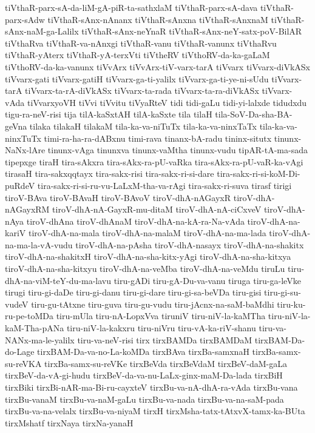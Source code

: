 {tiVthaR-parx-sA-da-liM-gA-piR-ta-sathxlaM
tiVthaR-parx-sA-dava
tiVthaR-parx-sAdw
tiVthaR-sAnx-nAnanx
tiVthaR-sAnxna
tiVthaR-sAnxnaM
tiVthaR-sAnx-naM-ga-Lalilx
tiVthaR-sAnx-neYnaR
tiVthaR-sAnx-neY-satx-poV-BilAR
tiVthaRva
tiVthaR-va-nAnxgi
tiVthaR-vanu
tiVthaR-vanunx
tiVthaRvu
tiVthaR-yAterx
tiVthaR-yA-terxVti
tiVtheRV
tiVthoRV-da-ka-gaLaM
tiVthoRV-da-ka-vanunx
tiVvArx
tiVvArx-tiV-varx-tarA
tiVvarx
tiVvarx-diVkASx
tiVvarx-gati
tiVvarx-gatiH
tiVvarx-ga-ti-yalilx
tiVvarx-ga-ti-ye-ni-sUdu
tiVvarx-tarA
tiVvarx-ta-rA-diVkASx
tiVvarx-ta-rada
tiVvarx-ta-ra-diVkASx
tiVvarx-vAda
tiVvarxyoVH
tiVvi
tiVvitu
tiVyaRteV
tidi
tidi-gaLu
tidi-yi-lalxde
tidudxdu
tigu-ra-neV-risi
tija
tilA-kaSxtAH
tilA-kaSxte
tila
tilaH
tila-SoV-Da-sha-BA-geVna
tilaka
tilakaH
tilakaM
tila-ka-va-niTuTx
tila-ka-va-ninxTaTx
tila-ka-va-ninxTuTx
timi-ra-ha-ra-dABxnu
timi-rava
tinanx-bA-radu
tininx-situtx
tinunx-NaNx-lAre
tinunx-vAga
tinunxva
tinunx-vaMtha
tinunx-vudu
tipAR-tA-ma-sada
tipepxge
tiraH
tira-sAkxra
tira-sAkx-ra-pU-vaRka
tira-sAkx-ra-pU-vaR-ka-vAgi
tirasaH
tira-sakxqqtayx
tira-sakx-risi
tira-sakx-ri-si-dare
tira-sakx-ri-si-koM-Di-puRdeV
tira-sakx-ri-si-ru-vu-LaLxM-tha-va-rAgi
tira-sakx-ri-suva
tirasf
tirigi
tiroV-BAva
tiroV-BAvaH
tiroV-BAvoV
tiroV-dhA-nAGayxR
tiroV-dhA-nAGayxRM
tiroV-dhA-nA-GayxR-mu-ditaM
tiroV-dhA-nA-ciCxveV
tiroV-dhA-nAya
tiroV-dhAna
tiroV-dhAnaM
tiroV-dhA-na-kA-ra-Na-vAda
tiroV-dhA-na-kariV
tiroV-dhA-na-mala
tiroV-dhA-na-malaM
tiroV-dhA-na-ma-lada
tiroV-dhA-na-ma-la-vA-vudu
tiroV-dhA-na-pAsha
tiroV-dhA-nasayx
tiroV-dhA-na-shakitx
tiroV-dhA-na-shakitxH
tiroV-dhA-na-sha-kitx-yAgi
tiroV-dhA-na-sha-kitxya
tiroV-dhA-na-sha-kitxyu
tiroV-dhA-na-veMba
tiroV-dhA-na-veMdu
tiruLu
tiru-dhA-na-viM-teY-du-ma-lavu
tiru-gADi
tiru-gA-Du-va-vanu
tiruga
tiru-ga-leVke
tirugi
tiru-gi-daDe
tiru-gi-danu
tiru-gi-dare
tiru-gi-sa-beVDa
tiru-gisi
tiru-gi-su-vudeV
tiru-gu-tAtxne
tiru-guva
tiru-gu-vudu
tiru-jAcnx-na-saM-baMdhi
tiru-ku-ru-pe-toMDa
tiru-mUla
tiru-nA-LopxVva
tiruniV
tiru-niV-la-kaMTha
tiru-niV-la-kaM-Tha-pANa
tiru-niV-la-kakxru
tiru-niVru
tiru-vA-ka-riV-shanu
tiru-va-NANx-ma-le-yalilx
tiru-va-neV-risi
tirx
tirxBAMDa
tirxBAMDaM
tirxBAM-Da-do-Lage
tirxBAM-Da-va-no-La-koMDa
tirxBAva
tirxBa-samxnaH
tirxBa-samx-su-reVKA
tirxBa-samx-su-reVKe
tirxBeVda
tirxBeVdaM
tirxBeV-daM-gaLa
tirxBeV-da-vA-gi-hudu
tirxBeV-da-va-nu-LaLx-ginx-maM-Da-lada
tirxBiH
tirxBiki
tirxBi-nAR-ma-Bi-ru-cayxteV
tirxBu-va-nA-dhA-ra-vAda
tirxBu-vana
tirxBu-vanaM
tirxBu-va-naM-gaLu
tirxBu-va-nada
tirxBu-va-na-saM-pada
tirxBu-va-na-velalx
tirxBu-va-niyaM
tirxH
tirxMsha-tatx-tAtxvX-tamx-ka-BUta
tirxMshatf
tirxNaya
tirxNa-yanaH
}

